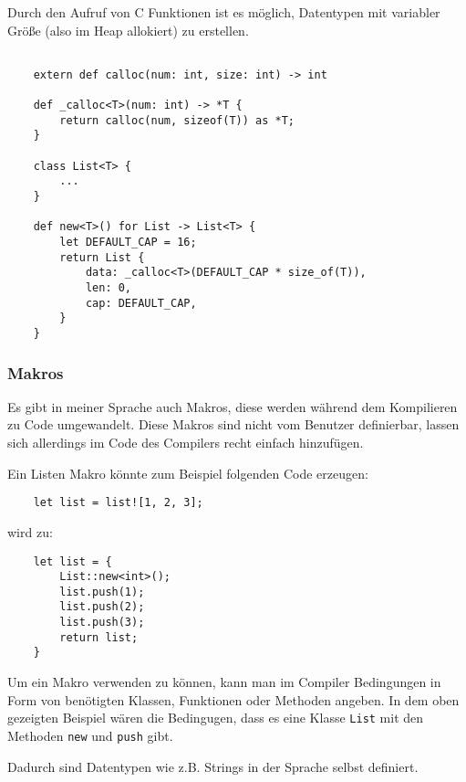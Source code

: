         
        Durch den Aufruf von C Funktionen ist es möglich, Datentypen mit variabler Größe (also im Heap allokiert) zu erstellen.

        \begin{lstlisting}

    extern def calloc(num: int, size: int) -> int

    def _calloc<T>(num: int) -> *T {
        return calloc(num, sizeof(T)) as *T;
    }

    class List<T> {
        ...
    }

    def new<T>() for List -> List<T> {
        let DEFAULT_CAP = 16;
        return List {
            data: _calloc<T>(DEFAULT_CAP * size_of(T)),
            len: 0,
            cap: DEFAULT_CAP,
        }
    }

        \end{lstlisting}
        \subsubsection{Makros}

        Es gibt in meiner Sprache auch Makros, diese werden während dem Kompilieren zu Code umgewandelt.
        Diese Makros sind nicht vom Benutzer definierbar, lassen sich allerdings im Code des Compilers 
        recht einfach hinzufügen.

        Ein Listen Makro könnte zum Beispiel folgenden Code erzeugen:

        \begin{lstlisting}
    let list = list![1, 2, 3];
        \end{lstlisting}

        wird zu:

        \begin{lstlisting}
    let list = {
        List::new<int>();
        list.push(1);
        list.push(2);
        list.push(3);
        return list;
    }
        \end{lstlisting}

    Um ein Makro verwenden zu können, kann man im Compiler Bedingungen in Form von benötigten Klassen, Funktionen oder Methoden 
    angeben. In dem oben gezeigten Beispiel wären die Bedingugen, dass es eine Klasse \texttt{List} mit den Methoden \texttt{new} und \texttt{push} gibt.

    Dadurch sind Datentypen wie z.B. Strings in der Sprache selbst definiert.

